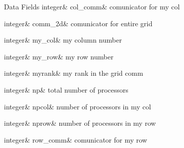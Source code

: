 \begin{DoxyFields}{Data Fields}
\mbox{\label{namespacepgrid2dclass_ab131ddd73cd143b1ba32af178309485d}} 
integer&
col\_comm&
comunicator for my col \\
\hline

\mbox{\label{namespacepgrid2dclass_ae763e51a65cd215ff76ea16e829e8bf0}} 
integer&
comm\_2d&
comunicator for entire grid \\
\hline

\mbox{\label{namespacepgrid2dclass_a912f6614074dde9e6f2c6d6f34d7cb99}} 
integer&
my\_col&
my column number \\
\hline

\mbox{\label{namespacepgrid2dclass_a722de079e498f0585f76a3d2680a6fbe}} 
integer&
my\_row&
my row number \\
\hline

\mbox{\label{namespacepgrid2dclass_ae8fc69fae700a32ac9003f8d4c414ee9}} 
integer&
myrank&
my rank in the grid comm \\
\hline

\mbox{\label{namespacepgrid2dclass_a058fc00a4851927b9f36da91b8188b49}} 
integer&
np&
total number of processors \\
\hline

\mbox{\label{namespacepgrid2dclass_a11d5de618bb0089e48647343ac855183}} 
integer&
npcol&
number of processors in my col \\
\hline

\mbox{\label{namespacepgrid2dclass_a5c94f44dfc943c9d0ffe88a6316999e8}} 
integer&
nprow&
number of processors in my row \\
\hline

\mbox{\label{namespacepgrid2dclass_a69b25ed31a7249c8940100a8977dc1b9}} 
integer&
row\_comm&
comunicator for my row \\
\hline

\end{DoxyFields}


